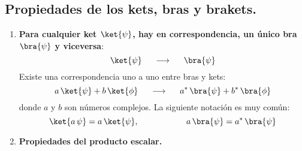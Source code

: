 \subsection*{Propiedades de los kets, bras y brakets.}
\begin{enumerate}[label=\alph*)]
\item \textbf{Para cualquier ket $\ket{\psi}$, hay en correspondencia, un único bra $\bra{\psi}$ y viceversa}:
\begin{equation}
\ket{\psi} \hspace{0.5cm} \longrightarrow \hspace{0.5cm} \bra{\psi}
\label{eq:ecuacion_02_26}
\end{equation}
Existe una correspondencia uno a uno entre bras y kets:
\begin{equation}
a \, \ket{\psi} + b \, \ket{\phi} \hspace{0.5cm} \longrightarrow \hspace{0.5cm} a^{*} \, \bra{\psi}
+ b^{*} \, \bra{\phi} \label{eq:ecuacion_02_27}
\end{equation}
donde $a$ y $b$ son números complejos. La siguiente notación es muy común:
\begin{equation}
\ket{a \, \psi} =  a \, \ket{\psi}, \hspace{2cm} a \, \bra{\psi} = a^{*} \, \bra{\psi}
\label{eq:ecuacion_02_28}
\end{equation}
\item \textbf{Propiedades del producto escalar.}


\end{enumerate}
